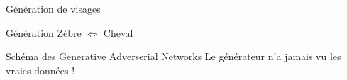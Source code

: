 \begin{frame}{Génération de visages}
\end{frame}

\begin{frame}{Génération Zèbre $\iff$ Cheval}
\end{frame}

\begin{frame}{Schéma des Generative Adverserial Networks}
  Le générateur n'a jamais vu les vraies données !
\end{frame}
